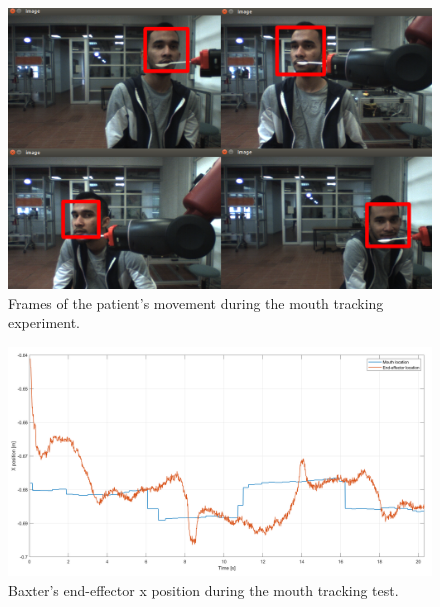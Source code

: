 \documentclass[11pt]{report} %
\begin{document}
\begin{figure}[H]
    \centering
    \includegraphics[width=1.0\linewidth]{assets/imgs/control_theory/mpc_tracking/real_mouth_tracking.png}
    \caption{Frames of the patient's movement during the mouth tracking experiment.} 
    \label{fig_real_mpc_mouth_tracking_experiments}
\end{figure}

\begin{figure}[H]
    \centering
    \includegraphics[width=1.0\linewidth]{assets/imgs/control_theory/mpc_tracking/x_pose.png}
    \caption{Baxter's end-effector x position during the mouth tracking test.} 
    \label{fig_baxter_x_pose_mpc_tracking_experiments}
\end{figure}
\end{document}
